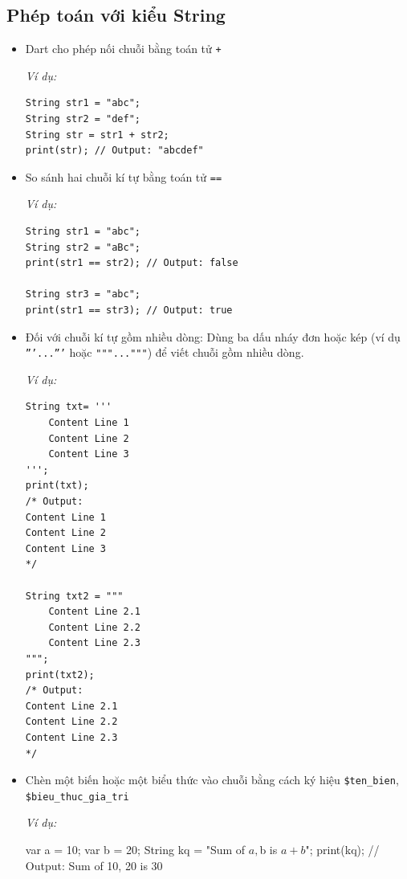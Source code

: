 \documentclass[../DoAn.tex]{subfiles}
\numberwithin{figure}{chapter}
\begin{document}
\subsection{Phép toán với kiểu String}
\begin{itemize}
\item Dart cho phép nối chuỗi bằng toán tử \texttt{+} 

\textit{Ví dụ:}
\begin{lstlisting}
String str1 = "abc";
String str2 = "def";
String str = str1 + str2;
print(str); // Output: "abcdef"
\end{lstlisting} 

\item So sánh hai chuỗi kí tự bằng toán tử \texttt{==} 

\textit{Ví dụ:}
\begin{lstlisting}
String str1 = "abc";
String str2 = "aBc";
print(str1 == str2); // Output: false

String str3 = "abc";
print(str1 == str3); // Output: true
\end{lstlisting}

\item Đối với chuỗi kí tự gồm nhiều dòng: Dùng ba dấu nháy đơn hoặc kép (ví dụ \texttt{'''...'''} hoặc \texttt{"""..."""}) để viết chuỗi gồm nhiều dòng.

\textit{Ví dụ:}
\begin{lstlisting}
String txt= '''
    Content Line 1
    Content Line 2
    Content Line 3
''';
print(txt);
/* Output: 
Content Line 1
Content Line 2
Content Line 3
*/

String txt2 = """
    Content Line 2.1
    Content Line 2.2
    Content Line 2.3
""";
print(txt2);
/* Output: 
Content Line 2.1
Content Line 2.2
Content Line 2.3
*/
\end{lstlisting}
\item Chèn một biến hoặc một biểu thức vào chuỗi bằng cách ký hiệu \texttt{\$ten\_bien}, \texttt{\$bieu\_thuc\_gia\_tri} 

\textit{Ví dụ:}
\begin{myverbatim}
var a = 10;
var b = 20;
String kq = "Sum of $a, $b is ${a + b}$";
print(kq); 
// Output: Sum of 10, 20 is 30
\end{myverbatim}
\end{itemize}
\end{document}
